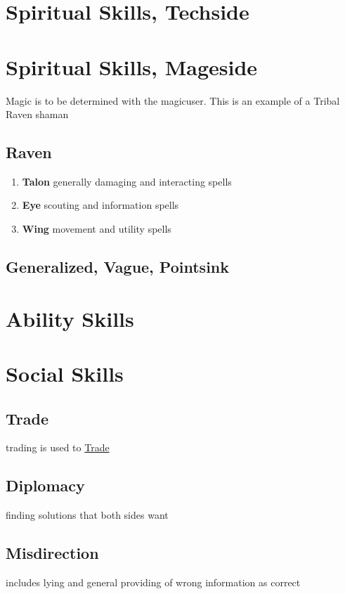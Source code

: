 \section{Spiritual Skills, Techside}\label{sec:spiritual-skills,-techside}

\section{Spiritual Skills, Mageside}\label{sec:spiritual-skills,-magicside}
Magic is to be determined with the magicuser.
This is an example of a Tribal Raven shaman
\subsection{Raven}\label{subsec:raven}
\begin{enumerate}[label= - ]
    \item \textbf{Talon} generally damaging and interacting spells
    \item \textbf{Eye} scouting and information spells
    \item \textbf{Wing} movement and utility spells
\end{enumerate}
\subsection{Generalized, Vague, Pointsink}\label{subsec:GVPS}
\section{Ability Skills}\label{sec:ability-skills}


\section{Social Skills}\label{sec:charisma-skills}
\subsection{Trade}\label{subsec:trade}
trading is used to \hyperref[ch:trade]{Trade}
\subsection{Diplomacy}\label{subsec:diplomacy}
finding solutions that both sides want
\subsection{Misdirection}\label{subsec:misdirection}
includes lying and general providing of wrong information as correct
